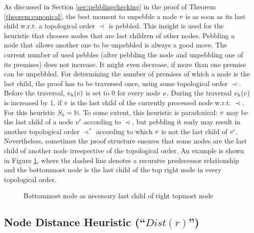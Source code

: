As discussed in Section \ref{sec:pebblingchecking} in the proof of Theorem \ref{theorem:canonical}, the best moment to unpebble a node $v$ is as soon as its last child w.r.t. a topological order $\prec$ is pebbled. 
This insight is used for the  heuristic that chooses nodes that are last children of other nodes. 
Pebbling a node that allows another one to be unpebbled is always a good move. 
The current number of used pebbles (after pebbling the node and unpebbling one of its premises) does not increase.
It might even decrease, if more than one premise can be unpebbled.
For determining the number of premises of which a node is the last child, the proof has to be traversed once, using some topological order $\prec$.
Before the traversal, $e_h(v)$ is set to 0 for every node $v$. During the traversal $e_h(v)$ is increased by 1, if $v$ is the last child of the currently processed node w.r.t. $\prec$. 
For this heuristic $S_h = \mathbb{N}$.
To some extent, this heuristic is paradoxical: $v$ may be the last child of a node $v'$ according to $\prec$, but pebbling it early may result in another topological order $\prec^*$ according to which $v$ is not the last child of $v'$.
Nevertheless, sometimes the proof structure ensures that some nodes are the last child of another node irrespective of the topological order. An example is shown in Figure \ref{fig:forcedLC}, where the dashed line denotes a recursive predecessor relationship and the bottommost node is the last child of the top right node in every topological order.

\begin{figure}[h]
	\caption{Bottommost node as necessary last child of right topmost node}
	\label{fig:forcedLC}
\end{figure}


\subsection{Node Distance Heuristic (``$Dist(r)$'')}
\label{sec:distance}

